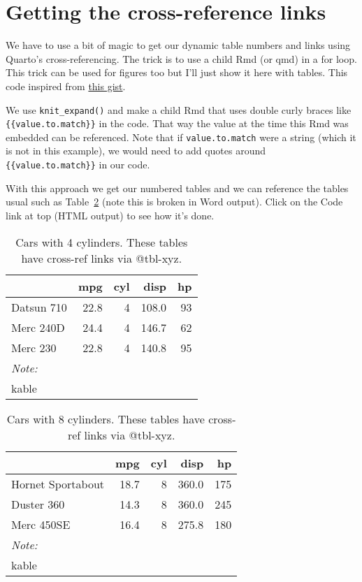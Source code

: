 \documentclass[
  letterpaper,
  oneside]{scrbook}
\begin{document}
\hypertarget{getting-the-cross-reference-links}{%
\section{Getting the cross-reference
links}\label{getting-the-cross-reference-links}}

We have to use a bit of magic to get our dynamic table numbers and links
using Quarto's cross-referencing. The trick is to use a child Rmd (or
qmd) in a for loop. This trick can be used for figures too but I'll just
show it here with tables. This code inspired from
\href{https://gist.github.com/rmoff/a043676a2f084b81a434}{this gist}.

We use \texttt{knit\_expand()} and make a child Rmd that uses double
curly braces like \texttt{\{\{value.to.match\}\}} in the code. That way
the value at the time this Rmd was embedded can be referenced. Note that
if \texttt{value.to.match} were a string (which it is not in this
example), we would need to add quotes around
\texttt{\{\{value.to.match\}\}} in our code.

With this approach we get our numbered tables and we can reference the
tables usual such as Table~\ref{tbl-cyl8} (note this is broken in Word
output). Click on the Code link at top (HTML output) to see how it's
done.

\hypertarget{tbl-cyl4}{}
\begin{table}
\caption{\label{tbl-cyl4}Cars with 4 cylinders. These tables have cross-ref links via @tbl-xyz. }\tabularnewline

\centering
\begin{tabular}[t]{lrrrr}
\toprule
  & mpg & cyl & disp & hp\\
\midrule
Datsun 710 & 22.8 & 4 & 108.0 & 93\\
Merc 240D & 24.4 & 4 & 146.7 & 62\\
Merc 230 & 22.8 & 4 & 140.8 & 95\\
\bottomrule
\multicolumn{5}{l}{\rule{0pt}{1em}\textit{Note: }}\\
\multicolumn{5}{l}{\rule{0pt}{1em}kable}\\
\end{tabular}
\end{table}

\hypertarget{tbl-cyl8}{}
\begin{table}
\caption{\label{tbl-cyl8}Cars with 8 cylinders. These tables have cross-ref links via @tbl-xyz. }\tabularnewline

\centering
\begin{tabular}[t]{lrrrr}
\toprule
  & mpg & cyl & disp & hp\\
\midrule
Hornet Sportabout & 18.7 & 8 & 360.0 & 175\\
Duster 360 & 14.3 & 8 & 360.0 & 245\\
Merc 450SE & 16.4 & 8 & 275.8 & 180\\
\bottomrule
\multicolumn{5}{l}{\rule{0pt}{1em}\textit{Note: }}\\
\multicolumn{5}{l}{\rule{0pt}{1em}kable}\\
\end{tabular}
\end{table}
\end{document}
